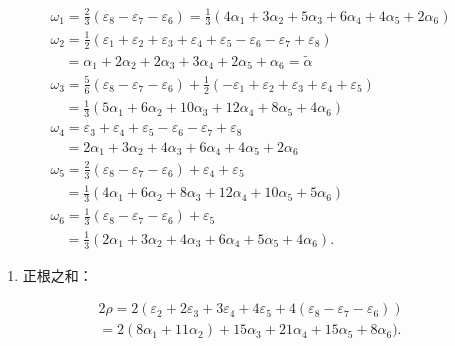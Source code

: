 \[
\begin{array}{l} \omega_ {1} = \frac {2}{3} (\varepsilon_ {8} - \varepsilon_ {7} - \varepsilon_ {6}) = \frac {1}{3} (4 \alpha_ {1} + 3 \alpha_ {2} + 5 \alpha_ {3} + 6 \alpha_ {4} + 4 \alpha_ {5} + 2 \alpha_ {6}) \\ \omega_ {2} = \frac {1}{2} (\varepsilon_ {1} + \varepsilon_ {2} + \varepsilon_ {3} + \varepsilon_ {4} + \varepsilon_ {5} - \varepsilon_ {6} - \varepsilon_ {7} + \varepsilon_ {8}) \\ \quad = \alpha_ {1} + 2 \alpha_ {2} + 2 \alpha_ {3} + 3 \alpha_ {4} + 2 \alpha_ {5} + \alpha_ {6} = \tilde {\alpha} \\ \omega_ {3} = \frac {5}{6} (\varepsilon_ {8} - \varepsilon_ {7} - \varepsilon_ {6}) + \frac {1}{2} (- \varepsilon_ {1} + \varepsilon_ {2} + \varepsilon_ {3} + \varepsilon_ {4} + \varepsilon_ {5}) \\ \quad = \frac {1}{3} (5 \alpha_ {1} + 6 \alpha_ {2} + 10 \alpha_ {3} + 12 \alpha_ {4} + 8 \alpha_ {5} + 4 \alpha_ {6}) \\ \omega_ {4} = \varepsilon_ {3} + \varepsilon_ {4} + \varepsilon_ {5} - \varepsilon_ {6} - \varepsilon_ {7} + \varepsilon_ {8} \\ \quad = 2 \alpha_ {1} + 3 \alpha_ {2} + 4 \alpha_ {3} + 6 \alpha_ {4} + 4 \alpha_ {5} + 2 \alpha_ {6} \\ \omega_ {5} = \frac {2}{3} (\varepsilon_ {8} - \varepsilon_ {7} - \varepsilon_ {6}) + \varepsilon_ {4} + \varepsilon_ {5} \\ \quad = \frac {1}{3} (4 \alpha_ {1} + 6 \alpha_ {2} + 8 \alpha_ {3} + 12 \alpha_ {4} + 10 \alpha_ {5} + 5 \alpha_ {6}) \\ \omega_ {6} = \frac {1}{3} (\varepsilon_ {8} - \varepsilon_ {7} - \varepsilon_ {6}) + \varepsilon_ {5} \\ \quad = \frac {1}{3} (2 \alpha_ {1} + 3 \alpha_ {2} + 4 \alpha_ {3} + 6 \alpha_ {4} + 5 \alpha_ {5} + 4 \alpha_ {6}). \end{array}
\]

\begin{enumerate}
\def\labelenumi{(\Roman{enumi})}
\setcounter{enumi}{6}
\tightlist
\item
  正根之和：
\end{enumerate}

\[
\begin{array}{l} 2 \rho = 2 (\varepsilon_ {2} + 2 \varepsilon_ {3} + 3 \varepsilon_ {4} + 4 \varepsilon_ {5} + 4 (\varepsilon_ {8} - \varepsilon_ {7} - \varepsilon_ {6})) \\ = 2 (8 \alpha_ {1} + 11 \alpha_ {2}) + 15 \alpha_ {3} + 21 \alpha_ {4} + 15 \alpha_ {5} + 8 \alpha_ {6}). \end{array}
\]

